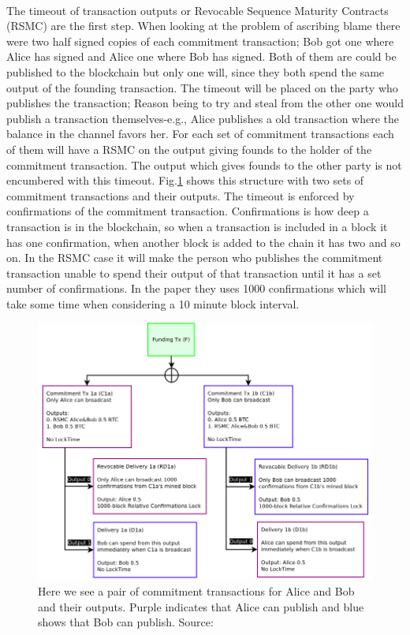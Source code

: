 \documentclass[informationsecurity]{gucmasterproject}
\begin{document}
\paragraph{}
The timeout of transaction outputs or Revocable Sequence Maturity Contracts (RSMC) are the first step. When looking at the problem of ascribing blame there were two half signed copies of each commitment transaction; Bob got one where Alice has signed and Alice one where Bob has signed. Both of them are could be published to the blockchain but only one will, since they both spend the same output of the founding transaction. The timeout will be placed on the party who publishes the transaction; Reason being to try and steal from the other one would publish a transaction themselves-e.g., Alice publishes a old transaction where the balance in the channel favors her. For each set of commitment transactions each of them will have a RSMC on the output giving founds to the holder of the commitment transaction. The output which gives founds to the other party is not encumbered with this timeout. Fig.\ref{fig:ln_timeout} shows this structure with two sets of commitment transactions and their outputs. The timeout is enforced by confirmations of the commitment transaction. Confirmations is how deep a transaction is in the blockchain, so when a transaction is included in a block it has one confirmation, when another block is added to the chain it has two and so on\cite{antonopoulos2017mastering}. In the RSMC case it will make the person who publishes the commitment transaction unable to spend their output of that transaction until it has a set number of confirmations. In the paper they uses 1000 confirmations which will take some time when considering a 10 minute block interval.

\begin{figure}[h]
    \centering
    \includegraphics[width=12cm]{ln_timeout.png}
    \caption{Here we see a pair of commitment transactions for Alice and Bob and their outputs. Purple indicates that Alice can publish and blue shows that Bob can publish. Source: \cite{poon2015bitcoin}}
    \label{fig:ln_timeout}
\end{figure}
\end{document}
